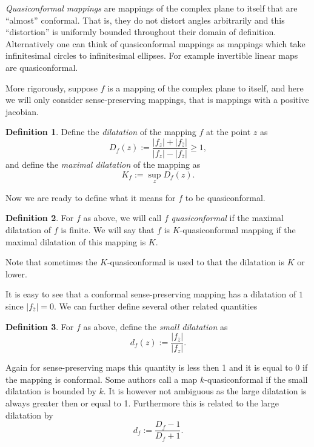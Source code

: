 \documentclass[12pt]{article}
\theoremstyle{theorem}
\theoremstyle{definition}
\newtheorem*{defn}{Definition}
\begin{document}
{\em Quasiconformal mappings} are mappings of the complex plane to itself that are ``almost'' conformal.  That is, they do not distort angles arbitrarily and this ``distortion'' is uniformly bounded throughout their domain of definition.  Alternatively one can think of quasiconformal mappings as mappings which take infinitesimal circles to infinitesimal ellipses.  For example invertible linear maps are quasiconformal.

More rigorously, suppose $f$ is a mapping of the complex plane to itself, and here we will only consider sense-preserving mappings, that is mappings with a positive jacobian.

\begin{defn}
Define the {\em dilatation} of the mapping $f$ at the point $z$ as
\begin{equation*}
D_f(z) := \frac{\lvert f_z \rvert + \lvert f_{\bar{z}} \rvert}{\lvert f_z \rvert-\lvert f_{\bar{z}}\rvert} \geq 1 ,
\end{equation*}
and define
the {\em maximal dilatation} of the mapping as
\begin{equation*}
K_f := \sup_z D_f(z) .
\end{equation*}
\end{defn}

Now we are ready to define what it means for $f$ to be quasiconformal.

\begin{defn}
For $f$ as above, we will call $f$ {\em quasiconformal} if the maximal
dilatation of $f$ is finite.  We will say that $f$
is $K$-quasiconformal mapping if the maximal dilatation of this mapping is $K$.
\end{defn}

Note that sometimes the  $K$-quasiconformal is used to  that the dilatation is $K$ or lower.

It is easy to see that a conformal sense-preserving mapping has a dilatation of $1$ since $\lvert f_{\bar{z}} \rvert = 0$.  We can further define several
other related quantities

\begin{defn}
For $f$ as above, define the {\em small dilatation} as
\begin{equation*}
d_f(z) := \frac{\lvert f_{\bar{z}} \rvert}{\lvert f_z \rvert} .
\end{equation*}
\end{defn}

Again for sense-preserving maps this quantity is less then 1 and it is equal to 0 if the mapping is conformal.  Some authors call a map $k$-quasiconformal if the small dilatation is bounded by $k$.  It is however not ambiguous as the large dilatation is always greater then or equal to 1.  Furthermore this is related to the large dilatation by
\begin{equation*}
d_f := \frac{D_f-1}{D_f+1} .
\end{equation*}
\end{document}

